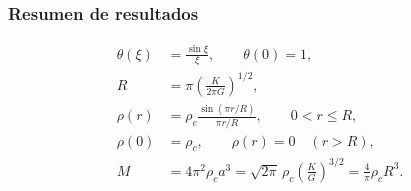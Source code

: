 \documentclass[11pt,a4paper]{article}
\begin{document}
\subsubsection*{Resumen de resultados}

\[
\boxed{
\begin{aligned}
    \theta(\xi) &= \frac{\sin\xi}{\xi}, \qquad \theta(0)=1,\\[4pt]
    R &= \pi\left(\frac{K}{2\pi G}\right)^{1/2},\\[4pt]
    \rho(r) &= \rho_c\frac{\sin(\pi r/R)}{\pi r/R},
        \qquad 0<r\le R,\\[4pt]
    \rho(0) &= \rho_c, \qquad \rho(r)=0 \quad (r>R),\\[4pt]
    M &= 4\pi^{2}\rho_c a^{3}
        =\sqrt{2\pi}\,\rho_c\left(\frac{K}{G}\right)^{3/2}
        =\frac{4}{\pi}\rho_c R^{3}.
\end{aligned}
}
\]
\end{document}
